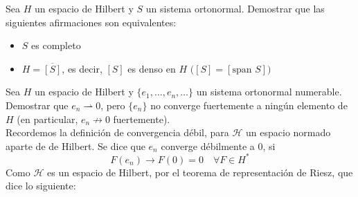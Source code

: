 \begin{ejercicio} %
    Sea $H$ un espacio de Hilbert y $S$ un sistema ortonormal. Demostrar que las siguientes afirmaciones son equivalentes:
    \begin{itemize}
        \item[(i)] $S$ es completo
        \item[(ii)] $H = \overline{[S]}$, es decir, $[S]$ es denso en $H$ $\big([S] = [\text{span } S]\big)$
    \end{itemize}
\end{ejercicio}

\begin{ejercicio}
    Sea $H$ un espacio de Hilbert y $\{e_1, \dots, e_n, \dots\}$ un sistema ortonormal numerable. \\
    Demostrar que $e_n \rightharpoonup 0$, pero $\{e_n\}$ no converge fuertemente a ningún elemento de $H$ (en particular, $e_n \not\longrightarrow 0$ fuertemente). \\

    \noindent
    Recordemos la definición de convergencia débil, para $\mathcal{H}$ un espacio normado aparte de de Hilbert. Se dice que $e_n$ converge débilmente a $0$, si
    \begin{equation*}
        F(e_n) \longrightarrow F(0) = 0 \quad \forall F \in H^*
    \end{equation*}
    Como $\mathcal{H}$ es un espacio de Hilbert, por el teorema de representación de Riesz, que dice lo siguiente: \\


\end{ejercicio}
